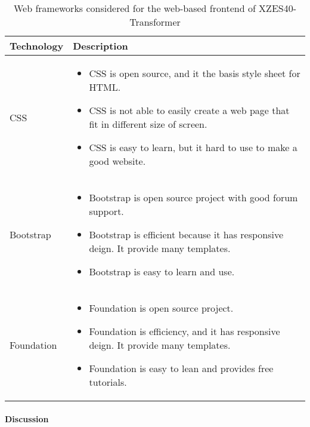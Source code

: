 \begin{table}[H]
  \begin{center}
      \begin{tabular}{ | l | p{10cm} |}
        \hline
        Technology & Description  \\ \hline
        CSS \cite{CSS_intro}&
        \begin{itemize}
          \item CSS is open source, and it the basis style sheet for HTML.
          \item CSS is not able to easily create a web page that fit in different size of screen.
          \item CSS is easy to learn, but it hard to use to make a good website.
        \end{itemize} \\ \hline

        Bootstrap \cite{boot_intro}&
        \begin{itemize}
          \item Bootstrap is open source project with good forum support.
          \item Bootstrap is efficient because it has responsive deign. It provide many templates.
          \item Bootstrap is easy to learn and use.
        \end{itemize} \\ \hline

        Foundation \cite{foundation_intro}&
        \begin{itemize}
          \item Foundation is open source project.
          \item Foundation is efficiency, and it has responsive deign. It provide many templates.
          \item Foundation is easy to lean and provides free tutorials.
        \end{itemize} \\ \hline
      \end{tabular}
  \end{center}
  \caption{Web frameworks considered for the web-based frontend of XZES40-Transformer}
\end{table}

\paragraph{Discussion}


